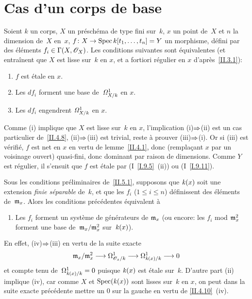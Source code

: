 \section{Cas d'un corps de base}
\label{II.5}

\begin{proposition}
\label{II.5.1}
Soient $k$ un corps, $X$ un pr\'esch\'ema de type fini sur~$k$,
$x$ un point de~$X$ et $n$ la dimension de~$X$ en~$x$,
$f\colon X\to\Spec k[t_1,\dots,t_n]=Y$
un morphisme, d\'efini par des \'el\'ements
$f_i\in\Gamma(X,\cal{O}_X)$.
Les conditions suivantes sont \'equivalentes (et entra\^inent que
$X$ est lisse sur~$k$ en $x$, et a fortiori r\'egulier en $x$
d'apr\`es~\ref{II.3.1}):
\begin{enumerate}
\item[(i)] $f$ est \'etale en $x$.
\item[(ii)] Les $df_i$ forment une base de~$\it{\Omega}_{X/k}^1$ en $x$.
\item[(iii)] Les $df_i$ engendrent $\it{\Omega}_{X/k}^1$ en $x$.
\end{enumerate}
\end{proposition}

Comme (i) implique que $X$ est lisse sur~$k$ en $x$, l'implication
(i)$\To$(ii) est un cas particulier de~\ref{II.4.8},
(ii)$\To$(iii) est trivial, reste \`a prouver
(iii)$\To$(i). Or si (iii) est v\'erifi\'e, $f$ est net
en $x$ en vertu de lemme~\ref{II.4.1}, donc (rempla\c cant $x$ par
un voisinage ouvert) quasi-fini, donc dominant par raison de
dimensions. Comme $Y$ est r\'egulier, il s'ensuit que $f$ est
\'etale par (I~\ref{I.9.5}~(ii)) ou (I~\ref{I.9.11}).

\begin{corollaire}
\label{II.5.2}
Sous les conditions pr\'eliminaires de~\ref{II.5.1}, supposons que
$\kres(x)$
soit une extension \emph{finie séparable} de~$k$, et
que les $f_i$ ($1\leq i\leq n$) d\'efinissent des \'el\'ements
de~$\goth{m}_x$. Alors les conditions pr\'ec\'edentes
\'equivalent \`a
\begin{enumerate}
\item[(iv)] Les $f_i$ forment un syst\`eme de g\'en\'erateurs de
$\goth{m}_x$ (ou encore: les $f_i$ mod $\goth{m}_x^2$ forment une base
de~$\goth{m}_x/\goth{m}_x^2$
sur~$\kres(x)$).
\end{enumerate}
\end{corollaire}

En effet, (iv)$\To$(iii) en vertu de la suite exacte
\begin{equation}
\label{eq:II.5.1}
\goth{m}_x/\goth{m}_x^2\to\Omega_{\cal{O}_x/k}^1\to
\Omega_{\kres(x)/k}^1\to 0
\end{equation}
et compte tenu de~$\Omega_{\kres(x)/k}^1=0$ puisque $\kres(x)$ est
\'etale sur~$k$. D'autre part (ii) implique (iv), car comme $X$ et
$\Spec(\kres(x))$ sont lisses sur~$k$ en $x$, on peut dans la suite
exacte pr\'ec\'edente mettre un $0$ sur la gauche en vertu de
\ref{II.4.10}~(iv).

